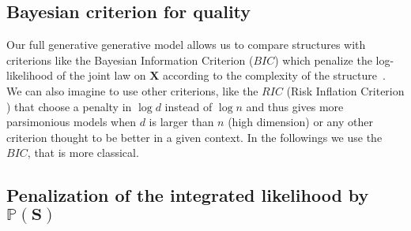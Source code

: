 \documentclass[12pt,a4paper]{report}
\begin{document}
			\subsection{Bayesian criterion for quality}
			
			
		Our full generative generative model allows us to compare structures with criterions like the Bayesian Information Criterion ($BIC$) which penalize the log-likelihood of the joint law on $\boldsymbol{X}$ according to the complexity of the structure~\cite{BIChuard}. \\
		
		
			 We can also imagine to use other criterions, like the $RIC$ (Risk Inflation Criterion ) that choose a penalty in $\log d$ instead of $\log n$ \cite{foster1994risk} and thus gives more parsimonious models when $d$ is larger than $n$ (high dimension) or any other criterion \cite{george1993variable} thought to be better in a given context.
		In the followings we use the $BIC$, that is more classical.
		
		
		\subsection{Penalization of the integrated likelihood by $\mathbb{P}(\boldsymbol{S})$} \label{compstruct}
		
\end{document}
